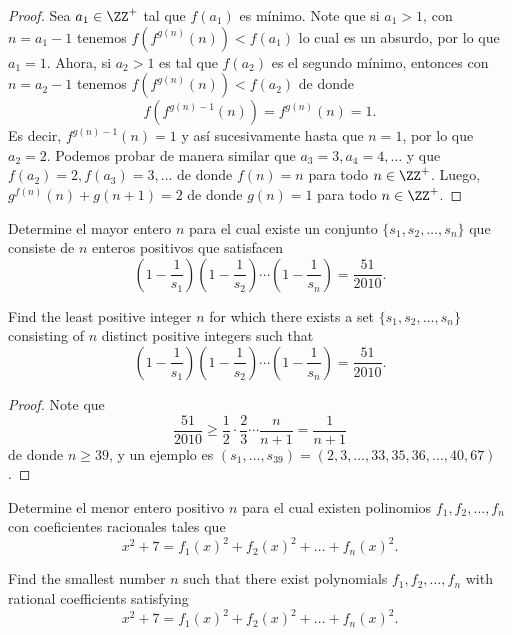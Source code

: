 \begin{proof}
	Sea $a_1\in\ZZ^+$ tal que $f(a_1)$ es mínimo. Note que si $a_1>1$, con $n=a_1-1$ tenemos $f(f^{g(n)}(n))<f(a_1)$ lo cual es un absurdo, por lo que $a_1=1$. Ahora, si $a_2>1$ es tal que $f(a_2)$ es el segundo mínimo, entonces con $n=a_2-1$ tenemos $f(f^{g(n)}(n))<f(a_2)$ de donde
	\[f(f^{g(n)-1}(n))=f^{g(n)}(n)=1.\]
	Es decir, $f^{g(n)-1}(n)=1$ y así sucesivamente hasta que $n=1$, por lo que $a_2=2$. Podemos probar de manera similar que $a_3=3,a_4=4,\dots$ y que $f(a_2)=2,f(a_3)=3,\dots$ de donde $f(n)=n$ para todo $n\in\ZZ^+$. Luego, $g^{f(n)}(n)+g(n+1)=2$ de donde $g(n)=1$ para todo $n\in\ZZ^+$.
\end{proof}


\begin{probEG}[ISL 2010/N2]
	Determine el mayor entero $n$ para el cual existe un conjunto $\{s_1,s_2,\dots,s_n\}$ que consiste de $n$ enteros positivos que satisfacen
	\[\left(1-\frac{1}{s_1}\right)\left(1-\frac{1}{s_2}\right)\cdots\left(1-\frac{1}{s_n}\right)=\frac{51}{2010}.\]
	\begin{hint}
		Find the least positive integer $n$ for which there exists a set $\{s_1,s_2,\dots,s_n\}$ consisting of $n$ distinct positive integers such that
		\[\left(1-\frac{1}{s_1}\right)\left(1-\frac{1}{s_2}\right)\cdots\left(1-\frac{1}{s_n}\right)=\frac{51}{2010}.\]
	\end{hint}
\end{probEG}

\begin{proof}
	Note que
	\[\frac{51}{2010}\ge\frac12\cdot\frac23\cdots\frac{n}{n+1}=\frac{1}{n+1}\]
	de donde $n\ge 39$, y un ejemplo es $(s_1,\dots,s_{39})=(2,3,\dots,33,35,36,\dots,40,67)$.
\end{proof}

\begin{probEB}[ISL 2010/N3]
	Determine el menor entero positivo $n$ para el cual existen polinomios $f_1,f_2,\dots,f_n$ con coeficientes racionales tales que
	\[x^2+7=f_1(x)^2+f_2(x)^2+\dots+f_n(x)^2.\]
	\begin{hint}
		Find the smallest number $n$ such that there exist polynomials $f_1,f_2,\dots,f_n$ with rational coefficients satisfying
		\[x^2+7=f_1(x)^2+f_2(x)^2+\dots+f_n(x)^2.\]
	\end{hint}
\end{probEB}

